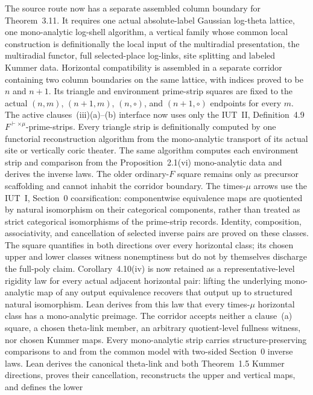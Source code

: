 \documentclass[11pt]{article}
\theoremstyle{plain}
\theoremstyle{definition}
\theoremstyle{remark}
\begin{document}
The source route now has a separate assembled column boundary for
Theorem~3.11.  It requires one actual absolute-label Gaussian log-theta
lattice, one mono-analytic log-shell algorithm, a vertical family whose common
local construction is definitionally the local input of the multiradial
presentation, the multiradial functor, full selected-place log-links, site
splitting and labeled Kummer data.  Horizontal compatibility is assembled in
a separate corridor containing two column boundaries on the same lattice,
with indices proved to be \(n\) and \(n+1\).  Its triangle and environment
prime-strip squares are fixed to the actual \((n,m)\), \((n+1,m)\),
\((n,\circ)\), and \((n+1,\circ)\) endpoints for every \(m\).  The active
clauses~(iii)(a)--(b) interface now uses only the IUT~II, Definition~4.9
\(F^{\vdash\times\mu}\)-prime-strips.  Every triangle strip is definitionally
computed by one functorial reconstruction algorithm from the mono-analytic
transport of its actual site or vertically coric theater.  The same algorithm
computes each environment strip and comparison from the
Proposition~2.1(vi) mono-analytic data and derives the inverse laws.  The older
ordinary-\(F\) square remains only as precursor
scaffolding and cannot inhabit the corridor boundary.  The times-\(\mu\)
arrows use the IUT~I, Section~0 coarsification: componentwise
equivalence maps are quotiented by natural isomorphism on their categorical
components, rather than treated as strict categorical isomorphisms of the
prime-strip records.  Identity, composition, associativity, and cancellation
of selected inverse pairs are proved on these classes.  The square quantifies
in both directions over every horizontal class; its chosen upper and lower
classes witness nonemptiness but do not by themselves discharge the full-poly
claim.  Corollary~4.10(iv) is now retained as a representative-level rigidity
law for every actual adjacent horizontal pair: lifting the underlying mono-analytic map of any output
equivalence recovers that output up to structured natural isomorphism.  Lean
derives from this law that every times-\(\mu\) horizontal class has a
mono-analytic preimage.  The corridor accepts neither a clause~(a) square, a
chosen theta-link member, an arbitrary quotient-level fullness witness, nor
chosen Kummer maps.  Every mono-analytic strip carries structure-preserving comparisons to
and from the common model with two-sided Section~0 inverse laws.  Lean derives
the canonical theta-link and both Theorem~1.5 Kummer directions, proves their
cancellation, reconstructs the upper and vertical maps, and defines the lower
\end{document}
